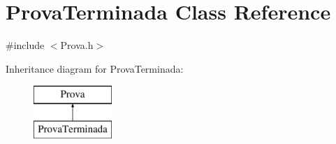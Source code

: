 \hypertarget{class_prova_terminada}{}\section{Prova\+Terminada Class Reference}
\label{class_prova_terminada}


{\ttfamily \#include $<$Prova.\+h$>$}

Inheritance diagram for Prova\+Terminada\+:\begin{figure}[H]
\begin{center}
\leavevmode
\includegraphics[height=2.000000cm]{class_prova_terminada}
\end{center}
\end{figure}

